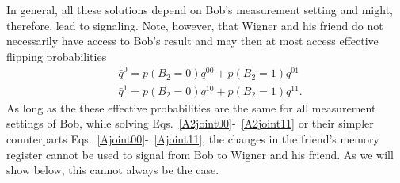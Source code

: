 \documentclass[a4paper,twocolumn,11pt,accepted=2017-05-09,dvipsnames]{quantumarticle}
\numberwithin{equation}{section}
\begin{document}
\begin{appendix}
In general, all these solutions depend on Bob's measurement setting and might, therefore, lead to signaling. Note, however, that Wigner and his friend do not necessarily have access to Bob's result and may then at most access effective flipping probabilities
\begin{align}
 &\bar{q}^0= p(B_2=0)q^{00}+ p(B_2=1)q^{01}\\
 &\bar{q}^1= p(B_2=0)q^{10}+ p(B_2=1)q^{11}.
\end{align}
As long as the these effective probabilities are the same for all measurement settings of Bob, while solving Eqs.~\eqref{A2joint00}-~\eqref{A2joint11} or their simpler counterparts Eqs.~\eqref{Ajoint00}-~\eqref{Ajoint11}, the changes in the friend's memory register cannot be used to signal from Bob to Wigner and his friend. As we will show below, this cannot always be the case. 


\end{appendix}
\end{document}
